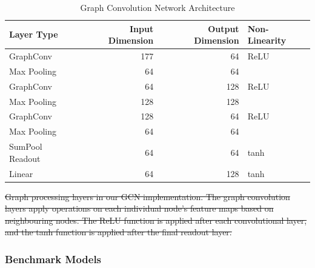 \documentclass[journal=jcisd8,manuscript=article]{achemso} %
\providecommand{\DIFdel}[1]{{\protect\color{red}\sout{#1}}}                      %
\providecommand{\DIFdelbegin}{} %
\providecommand{\DIFdelend}{} %
\providecommand{\DIFdelFL}[1]{\DIFdel{#1}} %
\begin{document}
\begin{table}
    \centering
    \begin{tabular}{@{}lrrl@{}}
    \hline
    \textbf{Layer Type} & \textbf{Input Dimension} & \textbf{Output Dimension} & \textbf{Non-Linearity} \\
    \hline
    GraphConv & 177 & 64 & ReLU \\
    Max Pooling & 64 & 64 & \\
    GraphConv & 64 & 128 & ReLU \\
    Max Pooling & 128 & 128 & \\
    GraphConv & 128 & 64 & ReLU \\
    Max Pooling & 64 & 64 & \\
    SumPool Readout & 64 & 64 & tanh \\
    Linear & 64 & 128 & tanh \\
    \hline  
    \end{tabular}
    \caption{Graph Convolution Network Architecture}
    \label{table:gcn-architecture}
\end{table}

\DIFdelbegin %
{%
\DIFdelFL{Graph processing layers in our GCN implementation. The graph convolution layers apply operations on each individual node's feature maps based on neighbouring nodes. The ReLU function is applied after each convolutional layer, and the tanh function is applied after the final readout layer.}}

\DIFdelend \subsubsection{Benchmark Models}
\end{document}
